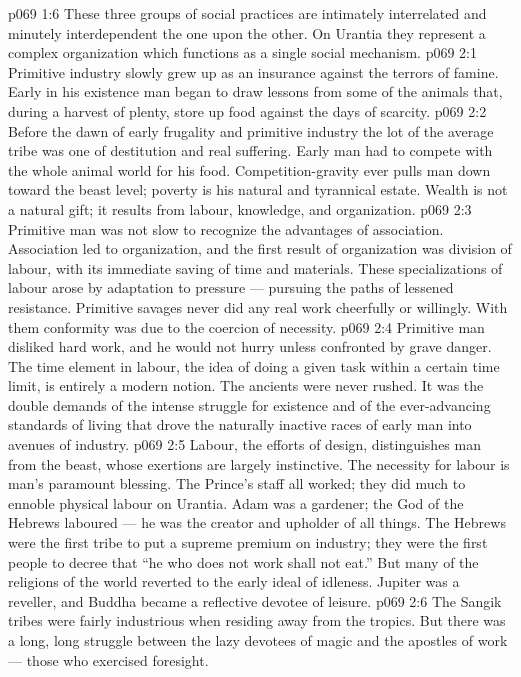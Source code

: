 \vs p069 1:6 \pc These three groups of social practices are intimately interrelated and minutely interdependent the one upon the other. On Urantia they represent a complex organization which functions as a single social mechanism.
\vs p069 2:1 Primitive industry slowly grew up as an insurance against the terrors of famine. Early in his existence man began to draw lessons from some of the animals that, during a harvest of plenty, store up food against the days of scarcity.
\vs p069 2:2 Before the dawn of early frugality and primitive industry the lot of the average tribe was one of destitution and real suffering. Early man had to compete with the whole animal world for his food. Competition\hyp{}gravity ever pulls man down toward the beast level; poverty is his natural and tyrannical estate. Wealth is not a natural gift; it results from labour, knowledge, and organization.
\vs p069 2:3 Primitive man was not slow to recognize the advantages of association. Association led to organization, and the first result of organization was division of labour, with its immediate saving of time and materials. These specializations of labour arose by adaptation to pressure --- pursuing the paths of lessened resistance. Primitive savages never did any real work cheerfully or willingly. With them conformity was due to the coercion of necessity.
\vs p069 2:4 Primitive man disliked hard work, and he would not hurry unless confronted by grave danger. The time element in labour, the idea of doing a given task within a certain time limit, is entirely a modern notion. The ancients were never rushed. It was the double demands of the intense struggle for existence and of the ever\hyp{}advancing standards of living that drove the naturally inactive races of early man into avenues of industry.
\vs p069 2:5 Labour, the efforts of design, distinguishes man from the beast, whose exertions are largely instinctive. The necessity for labour is man’s paramount blessing. The Prince’s staff all worked; they did much to ennoble physical labour on Urantia. Adam was a gardener; the God of the Hebrews laboured --- he was the creator and upholder of all things. The Hebrews were the first tribe to put a supreme premium on industry; they were the first people to decree that “he who does not work shall not eat.” But many of the religions of the world reverted to the early ideal of idleness. Jupiter was a reveller, and Buddha became a reflective devotee of leisure.
\vs p069 2:6 The Sangik tribes were fairly industrious when residing away from the tropics. But there was a long, long struggle between the lazy devotees of magic and the apostles of work --- those who exercised foresight.
